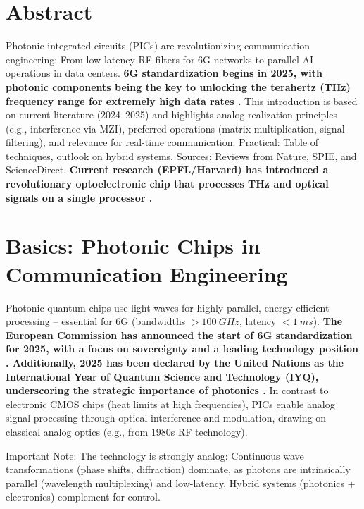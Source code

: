\section*{Abstract}
		Photonic integrated circuits (PICs) are revolutionizing communication engineering: From low-latency RF filters for 6G networks to parallel AI operations in data centers. \textbf{6G standardization begins in 2025, with photonic components being the key to unlocking the terahertz (THz) frequency range for extremely high data rates \cite{6g_roadmap}.} This introduction is based on current literature (2024--2025) and highlights analog realization principles (e.g., interference via MZI), preferred operations (matrix multiplication, signal filtering), and relevance for real-time communication. Practical: Table of techniques, outlook on hybrid systems. Sources: Reviews from Nature, SPIE, and ScienceDirect. \textbf{Current research (EPFL/Harvard) has introduced a revolutionary optoelectronic chip that processes THz and optical signals on a single processor \cite{thz_epfl}.}

	
	
	\section{Basics: Photonic Chips in Communication Engineering}
	
	Photonic quantum chips use light waves for highly parallel, energy-efficient processing -- essential for 6G (bandwidths $>\SI{100}{GHz}$, latency $<\SI{1}{ms}$). \textbf{The European Commission has announced the start of 6G standardization for 2025, with a focus on sovereignty and a leading technology position \cite{6g_roadmap}. Additionally, 2025 has been declared by the United Nations as the International Year of Quantum Science and Technology (IYQ), underscoring the strategic importance of photonics \cite{quantenjahr25}.} In contrast to electronic CMOS chips (heat limits at high frequencies), PICs enable analog signal processing through optical interference and modulation, drawing on classical analog optics (e.g., from 1980s RF technology).
	
	\begin{important}
		Important Note: The technology is strongly analog: Continuous wave transformations (phase shifts, diffraction) dominate, as photons are intrinsically parallel (wavelength multiplexing) and low-latency. Hybrid systems (photonics + electronics) complement for control.
	\end{important}
	
